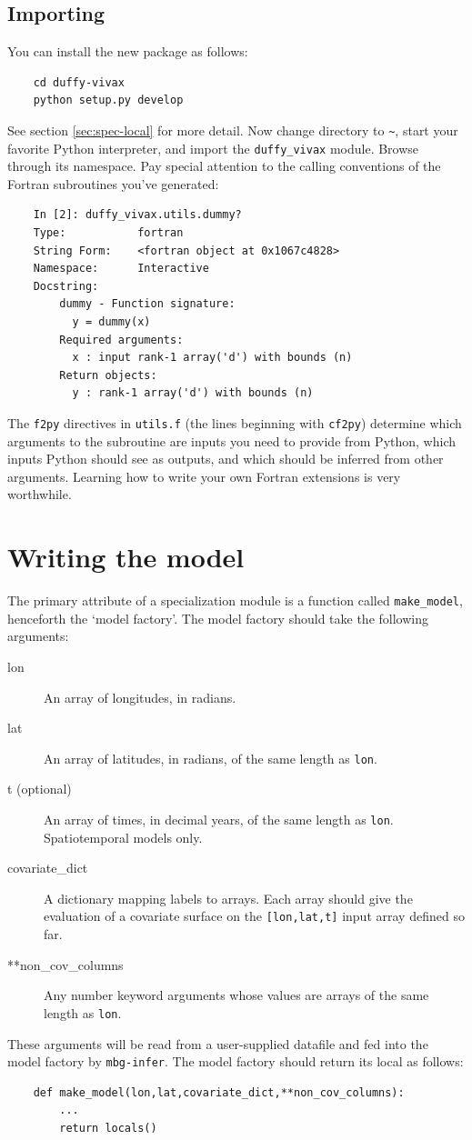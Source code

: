 \subsection{Importing}
You can install the new package as follows:
\begin{verbatim}
    cd duffy-vivax
    python setup.py develop
\end{verbatim}
See section \ref{sec:spec-local} for more detail. Now change directory to \texttt{\~}, start your favorite Python interpreter, and import the \texttt{duffy\_vivax} module. Browse through its namespace. Pay special attention to the calling conventions of the Fortran subroutines you've generated:
\begin{verbatim}
    In [2]: duffy_vivax.utils.dummy?
    Type:           fortran
    String Form:    <fortran object at 0x1067c4828>
    Namespace:      Interactive
    Docstring:
        dummy - Function signature:
          y = dummy(x)
        Required arguments:
          x : input rank-1 array('d') with bounds (n)
        Return objects:
          y : rank-1 array('d') with bounds (n)
\end{verbatim}
The \texttt{f2py} directives in \texttt{utils.f} (the lines beginning with \texttt{cf2py}) determine which arguments to the subroutine are inputs you need to provide from Python, which inputs Python should see as outputs, and which should be inferred from other arguments. Learning how to write your own Fortran extensions is very worthwhile.

\section{Writing the model}

The primary attribute of a specialization module is a function called \texttt{make\_model}, henceforth the `model factory'. The model factory should take the following arguments:
\begin{description}
    \item[lon] An array of longitudes, in radians.
    \item[lat] An array of latitudes, in radians, of the same length as \texttt{lon}.
    \item[t (optional)] An array of times, in decimal years, of the same length as \texttt{lon}. Spatiotemporal models only.
    \item[covariate\_dict] A dictionary mapping labels to arrays. Each array should give the evaluation of a covariate surface on the \texttt{[lon,lat,t]} input array defined so far.
    \item[**non\_cov\_columns] Any number keyword arguments whose values are arrays of the same length as \texttt{lon}.
\end{description}
These arguments will be read from a user-supplied datafile and fed into the model factory by \texttt{mbg-infer}. The model factory should return its local as follows: 
\begin{verbatim}
    def make_model(lon,lat,covariate_dict,**non_cov_columns):
        ...
        return locals()
\end{verbatim}

